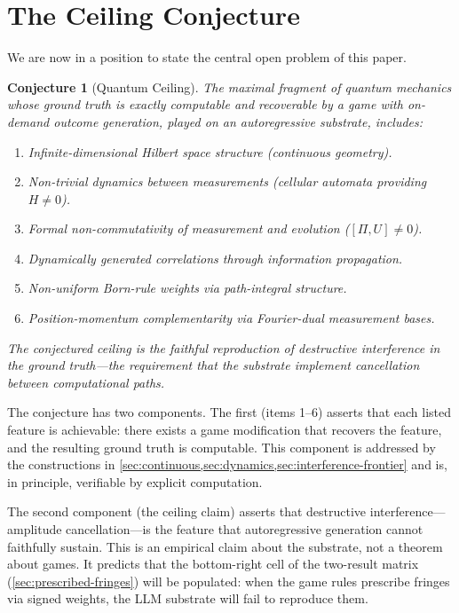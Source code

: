 \documentclass[12pt,a4paper]{article}
\newtheorem{conjecture}[theorem]{Conjecture}
\theoremstyle{definition}
\theoremstyle{remark}
\begin{document}
\section{The Ceiling Conjecture}
\label{sec:ceiling}

We are now in a position to state the central open problem of this paper.

\begin{conjecture}[Quantum Ceiling]
\label{conj:ceiling}
The maximal fragment of quantum mechanics whose ground truth is exactly computable and recoverable by a game with on-demand outcome generation, played on an autoregressive substrate, includes:
\begin{enumerate}[nosep]
  \item Infinite-dimensional Hilbert space structure (continuous geometry).
  \item Non-trivial dynamics between measurements (cellular automata providing $H \neq 0$).
  \item Formal non-commutativity of measurement and evolution ($[\Pi, U] \neq 0$).
  \item Dynamically generated correlations through information propagation.
  \item Non-uniform Born-rule weights via path-integral structure.
  \item Position-momentum complementarity via Fourier-dual measurement bases.
\end{enumerate}
The conjectured ceiling is the faithful reproduction of destructive interference in the ground truth---the requirement that the substrate implement cancellation between computational paths.
\end{conjecture}

The conjecture has two components.  The first (items 1--6) asserts that each listed feature is achievable: there exists a game modification that recovers the feature, and the resulting ground truth is computable.  This component is addressed by the constructions in \cref{sec:continuous,sec:dynamics,sec:interference-frontier} and is, in principle, verifiable by explicit computation.

The second component (the ceiling claim) asserts that destructive interference---amplitude cancellation---is the feature that autoregressive generation cannot faithfully sustain.  This is an empirical claim about the substrate, not a theorem about games.  It predicts that the bottom-right cell of the two-result matrix (\cref{sec:prescribed-fringes}) will be populated: when the game rules prescribe fringes via signed weights, the LLM substrate will fail to reproduce them.
\end{document}
